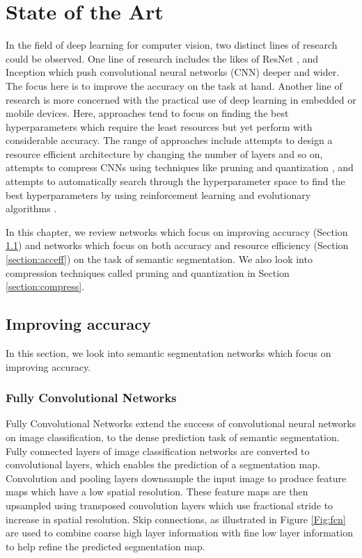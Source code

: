 
\chapter{State of the Art}

In the field of deep learning for computer vision, two distinct lines of research could be observed. One line of research includes the likes of ResNet \cite{DBLP:journals/corr/HeZRS15}, and Inception \cite{DBLP:journals/corr/SzegedyLJSRAEVR14} which push convolutional neural networks (CNN) deeper and wider. The focus here is to improve the accuracy on the task at hand. Another line of research is more concerned with the practical use of deep learning in embedded or mobile devices. Here, approaches tend to focus on finding the best hyperparameters which require the least resources but yet perform with considerable accuracy. The range of approaches include attempts to design a resource efficient architecture by changing the number of layers and so on, attempts to compress CNNs using techniques like pruning \cite{DBLP:journals/corr/MolchanovTKAK16} and quantization \cite{DBLP:journals/corr/WuLWHC15}, and attempts to automatically search through the hyperparameter space to find the best hyperparameters by using reinforcement learning \cite{DBLP:journals/corr/ZophL16} and evolutionary algorithms \cite{DBLP:journals/corr/abs-1802-01548}. 

In this chapter, we review networks which focus on improving accuracy (Section \ref{section:impacc}) and networks which focus on both accuracy and resource efficiency (Section \ref{section:acceff}) on the task of semantic segmentation. We also look into compression techniques called pruning and quantization in Section \ref{section:compress}.


\section{Improving accuracy}
\label{section:impacc}

In this section, we look into semantic segmentation networks which focus on improving accuracy. 

\subsection{Fully Convolutional Networks}

Fully Convolutional Networks \cite{DBLP:journals/corr/LongSD14} extend the success of convolutional neural networks on image classification, to the dense prediction task of semantic segmentation. Fully connected layers of image classification networks are converted to convolutional layers, which enables the prediction of a segmentation map. Convolution and pooling layers downsample the input image to produce feature maps which have a low spatial resolution. These feature maps are then upsampled using transposed convolution layers which use fractional stride to increase in spatial resolution. Skip connections, as illustrated in Figure \ref{Fig:fcn} are used to combine coarse high layer information with fine low layer information to help refine the predicted segmentation map. 

